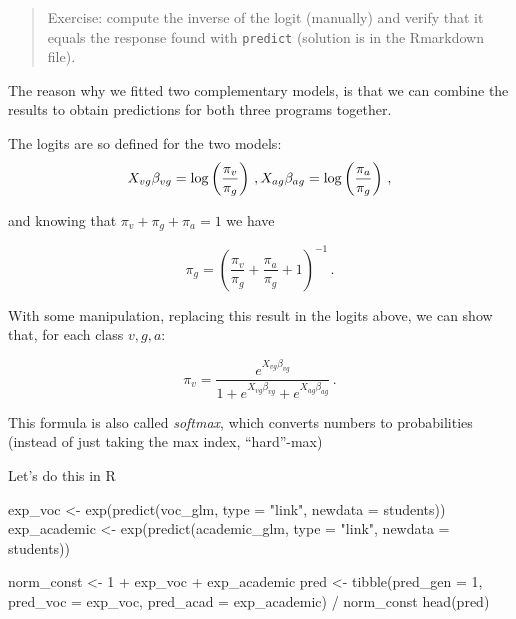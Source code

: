 \documentclass[
  oneside]{book}
\newenvironment{Shaded}{\begin{snugshade}}{\end{snugshade}}
\newcommand{\AttributeTok}[1]{\textcolor[rgb]{0.77,0.63,0.00}{#1}}
\newcommand{\DecValTok}[1]{\textcolor[rgb]{0.00,0.00,0.81}{#1}}
\newcommand{\FunctionTok}[1]{\textcolor[rgb]{0.00,0.00,0.00}{#1}}
\newcommand{\NormalTok}[1]{#1}
\newcommand{\OtherTok}[1]{\textcolor[rgb]{0.56,0.35,0.01}{#1}}
\newcommand{\SpecialCharTok}[1]{\textcolor[rgb]{0.00,0.00,0.00}{#1}}
\newcommand{\StringTok}[1]{\textcolor[rgb]{0.31,0.60,0.02}{#1}}
\begin{document}
\begin{quote}
Exercise: compute the inverse of the logit (manually) and verify that
it equals the response found with \texttt{predict} (solution is in the Rmarkdown
file).
\end{quote}

The reason why we fitted two complementary models, is that we can combine
the results to obtain predictions for both three programs together.

The logits are so defined for the two models:
\[
X_{vg}\beta_{vg} = \log\left(\frac{\pi_{v}}{\pi_g}\right)\,,\\
X_{ag}\beta_{ag} = \log\left(\frac{\pi_{a}}{\pi_g}\right)\,,
\]

and knowing that \(\pi_v + \pi_g + \pi_a = 1\)
we have

\[
\pi_g = \left(\frac{\pi_v}{\pi_g} + \frac{\pi_a}{\pi_g} + 1\right)^{-1}\,.
\]

With some manipulation, replacing this result in the
logits above, we can show that, for each class \(v, g, a\):

\[
\pi_v = \frac{e^{X_{vg}\beta_{vg}}}{1 + e^{X_{vg}\beta_{vg}} + e^{X_{ag}\beta_{ag}}}\,.
\]

This formula is also called \emph{softmax}, which converts numbers to probabilities (instead
of just taking the max index, ``hard''-max)

Let's do this in R

\begin{Shaded}
\begin{Highlighting}[]
\NormalTok{exp\_voc }\OtherTok{\textless{}{-}} \FunctionTok{exp}\NormalTok{(}\FunctionTok{predict}\NormalTok{(voc\_glm, }\AttributeTok{type =} \StringTok{"link"}\NormalTok{, }\AttributeTok{newdata =}\NormalTok{ students))}
\NormalTok{exp\_academic }\OtherTok{\textless{}{-}} \FunctionTok{exp}\NormalTok{(}\FunctionTok{predict}\NormalTok{(academic\_glm, }\AttributeTok{type =} \StringTok{"link"}\NormalTok{, }\AttributeTok{newdata =}\NormalTok{ students))}
\end{Highlighting}
\end{Shaded}

\begin{Shaded}
\begin{Highlighting}[]
\NormalTok{norm\_const }\OtherTok{\textless{}{-}} \DecValTok{1} \SpecialCharTok{+}\NormalTok{ exp\_voc }\SpecialCharTok{+}\NormalTok{ exp\_academic}
\NormalTok{pred }\OtherTok{\textless{}{-}} \FunctionTok{tibble}\NormalTok{(}\AttributeTok{pred\_gen =} \DecValTok{1}\NormalTok{, }\AttributeTok{pred\_voc =}\NormalTok{ exp\_voc, }
               \AttributeTok{pred\_acad =}\NormalTok{ exp\_academic) }\SpecialCharTok{/}\NormalTok{ norm\_const}
\FunctionTok{head}\NormalTok{(pred)}
\end{Highlighting}
\end{Shaded}
\end{document}
